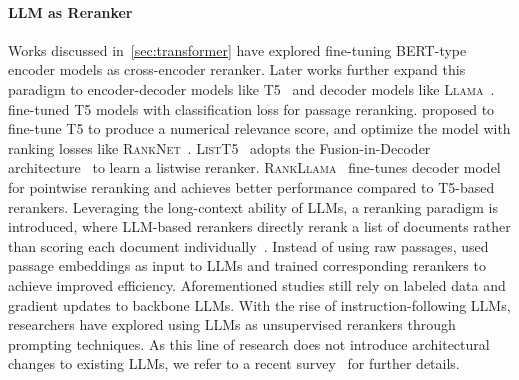 \paragraph{LLM as Reranker}
Works discussed in~\cref{sec:transformer} have explored fine-tuning \textsc{BERT}-type encoder models as cross-encoder reranker. Later works further expand this paradigm to encoder-decoder models like \textsc{T5}~\cite{raffel2020transfer} and decoder models like \textsc{Llama}~\cite{touvron2023llama}. \citet{nogueira2020documentrankingpretrainedsequencetosequence} fine-tuned \textsc{T5} models with classification loss for passage reranking. \citet{zhuang2023rankt5} proposed to fine-tune \textsc{T5} to produce a numerical relevance score, and optimize the model with ranking losses like \textsc{RankNet}~\cite{burges2010ranknet}. \textsc{ListT5}~\cite{yoon-etal-2024-listt5} adopts the Fusion-in-Decoder architecture~\cite{izacard-grave-2021-leveraging} to learn a listwise reranker.
\textsc{RankLlama}~\cite{ma2024fine} fine-tunes decoder model for pointwise reranking and achieves better performance compared to \textsc{T5}-based rerankers.  
Leveraging the long-context ability of LLMs, a reranking paradigm is introduced, where LLM-based rerankers directly rerank a list of documents rather than scoring each document individually~\cite{ma2023zeroshotlistwisedocumentreranking,zhang2023rank,pradeep2023rankvicunazeroshotlistwisedocument,pradeep2023rankzephyreffectiverobustzeroshot}.
Instead of using raw passages, \citet{liu2024leveraging} used passage embeddings as input to LLMs and trained corresponding rerankers to achieve improved efficiency. 
Aforementioned studies still rely on labeled data and gradient updates to backbone LLMs. With the rise of instruction-following LLMs, researchers have explored using LLMs as unsupervised rerankers through prompting techniques. 
As this line of research does not introduce architectural changes to existing LLMs, we refer to a recent survey~\cite{zhu2023large} for further details.

